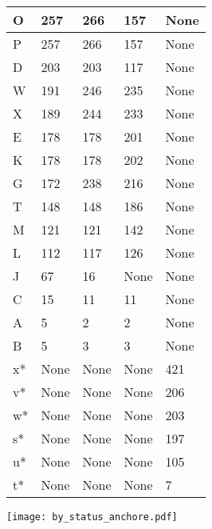 \begin{center}
\begin{longtable} {| p{} | p{} | p{} | p{} | p{} |}
\hline
O  &    257   &   266  &   157   &   None    \\   
\hline
P  &    257   &   266  &   157   &   None    \\   
\hline
D  &    203   &   203  &   117   &   None    \\   
\hline
W  &    191   &   246  &   235   &   None    \\   
\hline
X  &    189   &   244  &   233   &   None    \\   
\hline
E  &    178   &   178  &   201   &   None    \\   
\hline
K  &    178   &   178  &   202   &   None    \\   
\hline
G  &    172   &   238  &   216   &   None    \\   
\hline
T  &    148   &   148  &   186   &   None    \\   
\hline
M  &    121   &   121  &   142   &   None    \\   
\hline
L  &    112   &   117  &   126   &   None    \\   
\hline
J  &    67   &   16  &   None   &   None    \\   
\hline
C  &    15   &   11  &   11   &   None    \\   
\hline
A  &    5   &   2  &   2   &   None    \\   
\hline
B  &    5   &   3  &   3   &   None    \\   
\hline
x*  &    None   &   None  &   None   &   421    \\   
\hline
v*  &    None   &   None  &   None   &   206    \\   
\hline
w*  &    None   &   None  &   None   &   203    \\   
\hline
s*  &    None   &   None  &   None   &   197    \\   
\hline
u*  &    None   &   None  &   None   &   105    \\   
\hline
t*  &    None   &   None  &   None   &   7    \\   
\hline
\end{longtable}
\label{tab:vulnerabilities}
\end{center}
\begin{center}
\texttt{[image: by\_status\_anchore.pdf]}
\label{fig:anchore}
\end{center}

